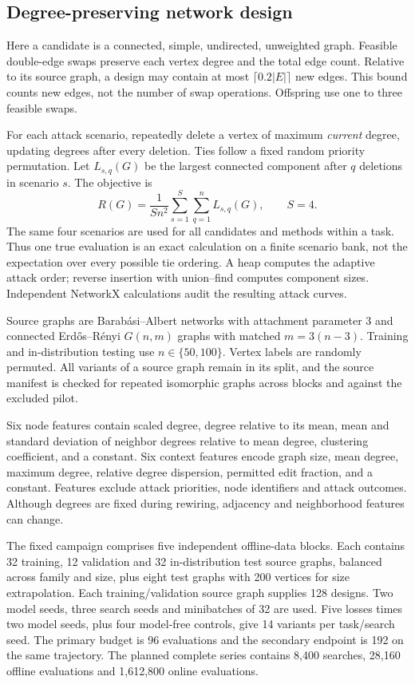 \documentclass[11pt,a4paper]{article}
\begin{document}
\subsection{Degree-preserving network design}
Here a candidate is a connected, simple, undirected, unweighted graph. Feasible double-edge swaps preserve each vertex degree and the total edge count. Relative to its source graph, a design may contain at most $\lceil0.2|E|\rceil$ new edges. This bound counts new edges, not the number of swap operations. Offspring use one to three feasible swaps.

For each attack scenario, repeatedly delete a vertex of maximum \emph{current} degree, updating degrees after every deletion. Ties follow a fixed random priority permutation. Let $L_{s,q}(G)$ be the largest connected component after $q$ deletions in scenario $s$. The objective is
\begin{equation}
R(G)=\frac{1}{Sn^2}\sum_{s=1}^{S}\sum_{q=1}^{n}L_{s,q}(G),\qquad S=4.
\end{equation}
The same four scenarios are used for all candidates and methods within a task. Thus one true evaluation is an exact calculation on a finite scenario bank, not the expectation over every possible tie ordering. A heap computes the adaptive attack order; reverse insertion with union--find computes component sizes. Independent NetworkX calculations audit the resulting attack curves.

Source graphs are Barab\'asi--Albert networks with attachment parameter 3 and connected Erd\H{o}s--R\'enyi $G(n,m)$ graphs with matched $m=3(n-3)$. Training and in-distribution testing use $n\in\{50,100\}$. Vertex labels are randomly permuted. All variants of a source graph remain in its split, and the source manifest is checked for repeated isomorphic graphs across blocks and against the excluded pilot.

Six node features contain scaled degree, degree relative to its mean, mean and standard deviation of neighbor degrees relative to mean degree, clustering coefficient, and a constant. Six context features encode graph size, mean degree, maximum degree, relative degree dispersion, permitted edit fraction, and a constant. Features exclude attack priorities, node identifiers and attack outcomes. Although degrees are fixed during rewiring, adjacency and neighborhood features can change.

The fixed campaign comprises five independent offline-data blocks. Each contains 32 training, 12 validation and 32 in-distribution test source graphs, balanced across family and size, plus eight test graphs with 200 vertices for size extrapolation. Each training/validation source graph supplies 128 designs. Two model seeds, three search seeds and minibatches of 32 are used. Five losses times two model seeds, plus four model-free controls, give 14 variants per task/search seed. The primary budget is 96 evaluations and the secondary endpoint is 192 on the same trajectory. The planned complete series contains 8,400 searches, 28,160 offline evaluations and 1,612,800 online evaluations.
\end{document}
